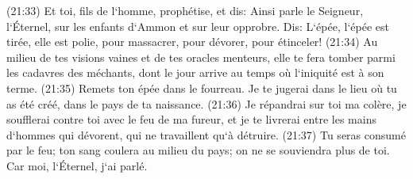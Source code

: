 \verse (21:33) Et toi, fils de l`homme, prophétise, et dis: Ainsi parle le Seigneur, l`Éternel, sur les enfants d`Ammon et sur leur opprobre. Dis: L`épée, l`épée est tirée, elle est polie, pour massacrer, pour dévorer, pour étinceler! 
\verse (21:34) Au milieu de tes visions vaines et de tes oracles menteurs, elle te fera tomber parmi les cadavres des méchants, dont le jour arrive au temps où l`iniquité est à son terme. 
\verse (21:35) Remets ton épée dans le fourreau. Je te jugerai dans le lieu où tu as été créé, dans le pays de ta naissance. 
\verse (21:36) Je répandrai sur toi ma colère, je soufflerai contre toi avec le feu de ma fureur, et je te livrerai entre les mains d`hommes qui dévorent, qui ne travaillent qu`à détruire. 
\verse (21:37) Tu seras consumé par le feu; ton sang coulera au milieu du pays; on ne se souviendra plus de toi. Car moi, l`Éternel, j`ai parlé. 

